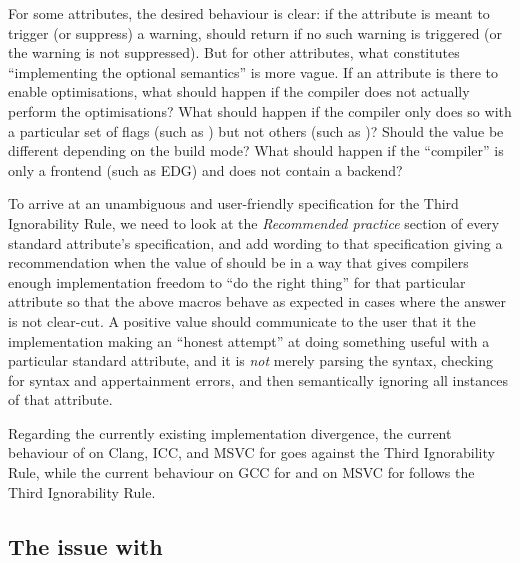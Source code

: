 For some attributes, the desired behaviour is clear: if the attribute is meant to trigger (or suppress) a warning,  should return  if no such warning is triggered (or the warning is not suppressed). But for other attributes, what constitutes ``implementing the optional semantics'' is more vague. If an attribute is there to enable optimisations, what should happen if the compiler does not actually perform the optimisations? What should happen if the compiler only does so with a particular set of flags (such as ) but not others (such as )? Should the value be different depending on the build mode? What should happen if the ``compiler'' is only a frontend (such as EDG) and does not contain a backend?

To arrive at an unambiguous and user-friendly specification for the Third Ignorability Rule, we need to look at the \emph{Recommended practice} section of every standard attribute's specification, and add wording to that specification giving a recommendation when the value of  should be  in a way that gives compilers enough implementation freedom to ``do the right thing'' for that particular attribute so that the above macros behave as expected in cases where the answer is not clear-cut. A positive value should communicate to the user that it the implementation making an ``honest attempt'' at doing something useful with a particular standard attribute, and it is \emph{not} merely parsing the syntax, checking for syntax and appertainment errors, and then semantically ignoring all instances of that attribute.

Regarding the currently existing implementation divergence, the current behaviour of  on Clang, ICC, and MSVC for  goes against the Third Ignorability Rule, while the current behaviour on GCC for \mbox{} and on MSVC for  follows the Third Ignorability Rule.

\subsection{The issue with }

